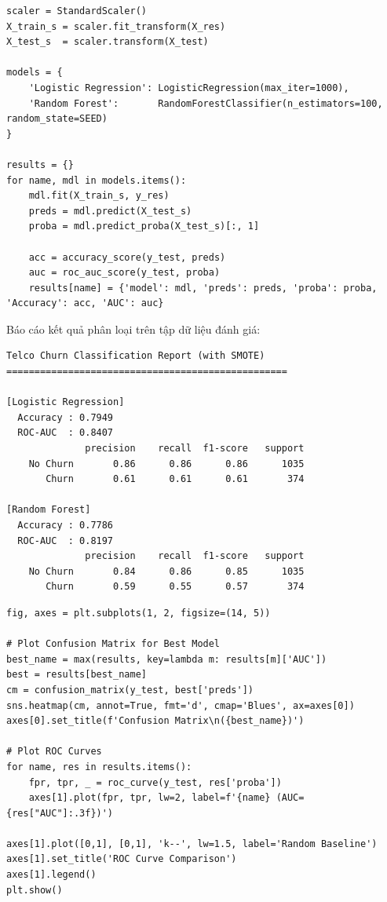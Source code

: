 \begin{lstlisting}[style=pythoncode, caption={Chuẩn hóa và Huấn luyện các mô hình học máy}]
scaler = StandardScaler()
X_train_s = scaler.fit_transform(X_res)
X_test_s  = scaler.transform(X_test)

models = {
    'Logistic Regression': LogisticRegression(max_iter=1000),
    'Random Forest':       RandomForestClassifier(n_estimators=100, random_state=SEED)
}

results = {}
for name, mdl in models.items():
    mdl.fit(X_train_s, y_res)
    preds = mdl.predict(X_test_s)
    proba = mdl.predict_proba(X_test_s)[:, 1]
    
    acc = accuracy_score(y_test, preds)
    auc = roc_auc_score(y_test, proba)
    results[name] = {'model': mdl, 'preds': preds, 'proba': proba, 'Accuracy': acc, 'AUC': auc}
\end{lstlisting}

Báo cáo kết quả phân loại trên tập dữ liệu đánh giá:

\begin{lstlisting}[style=consoleoutput, caption={Báo cáo các chỉ số phân loại (Classification Report)}]
Telco Churn Classification Report (with SMOTE)
==================================================

[Logistic Regression]
  Accuracy : 0.7949
  ROC-AUC  : 0.8407
              precision    recall  f1-score   support
    No Churn       0.86      0.86      0.86      1035
       Churn       0.61      0.61      0.61       374

[Random Forest]
  Accuracy : 0.7786
  ROC-AUC  : 0.8197
              precision    recall  f1-score   support
    No Churn       0.84      0.86      0.85      1035
       Churn       0.59      0.55      0.57       374
\end{lstlisting}

\begin{lstlisting}[style=pythoncode, caption={Trực quan hóa Confusion Matrix và ROC Curve}]
fig, axes = plt.subplots(1, 2, figsize=(14, 5))

# Plot Confusion Matrix for Best Model
best_name = max(results, key=lambda m: results[m]['AUC'])
best = results[best_name]
cm = confusion_matrix(y_test, best['preds'])
sns.heatmap(cm, annot=True, fmt='d', cmap='Blues', ax=axes[0])
axes[0].set_title(f'Confusion Matrix\n({best_name})')

# Plot ROC Curves
for name, res in results.items():
    fpr, tpr, _ = roc_curve(y_test, res['proba'])
    axes[1].plot(fpr, tpr, lw=2, label=f'{name} (AUC={res["AUC"]:.3f})')

axes[1].plot([0,1], [0,1], 'k--', lw=1.5, label='Random Baseline')
axes[1].set_title('ROC Curve Comparison')
axes[1].legend()
plt.show()
\end{lstlisting}


